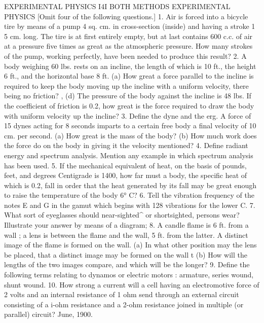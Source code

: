 EXPERIMENTAL PHYSICS I4I
BOTH METHODS EXPERIMENTAL PHYSICS
[Omit four of the following questions.]
1. Air is forced into a bicycle tire by means of a pump 4 sq. cm. in cross-section (inside) and having a stroke 1 5 cm. long. The tire is at first entirely empty, but at last contains 600 c.c. of air at a pressure five times as great as the atmospheric pressure. How many strokes of the pump, working perfectly, have been needed to produce this result?
2. A body weighing 60 lbs. rests on an incline, the length of which is 10 ft., the height 6 ft., and the horizontal base 8 ft.
(a) How great a force parallel to the incline is required to keep the body moving up the incline with a uniform velocity, there being no friction? ,
(d) The pressure of the body against the incline is 48 lbs. If the coefficient of friction is 0.2, how great is the force required to draw the body with uniform velocity up the incline?
3. Define the dyne and the erg. A force of 15 dynes acting for 8 seconds imparts to a certain free body a final velocity of 10 cm. per second.
(a) How great is the mass of the body?
(b) How much work does the force do on the body in giving it the velocity mentioned?
4. Define radiant energy and spectrum analysis. Mention any example in which spectrum analysis has been used.
5. If the mechanical equivalent of heat, on the basis of pounds, feet, and degrees Centigrade is 1400, how far must a body, the specific heat of which is 0.2, fall in order that the heat generated by its fall may be great enough to raise the temperature of the body 6° C?
6. Tell the vibration frequency of the notes E and G in the gamut which begins with 128 vibrations for the lower C.
7. What sort of eyeglasses should near-sighted^ or shortsighted, persons wear? Illustrate your answer by means of a diagram;
8. A candle flame is 6 ft. from a wall ; a lens is between the flame and the wall, 5 ft. from the latter. A distinct image of the flame is formed on the wall.
(a) In what other position may the lens be placed, that a distinct image may be formed on the wall t
(b) How will the lengths of the two images compare, and which will be the longer?
9. Define the following terms relating to dynamos or electric motors : armature, series wound, shunt wound.
10. How strong a current will a cell having an electromotive force of 2 volts and an internal resistance of 1 ohm send through an external circuit consisting of a i-ohm resistance and a 2-ohm resistance joined in multiple (or parallel) circuit?
June, 1900.
